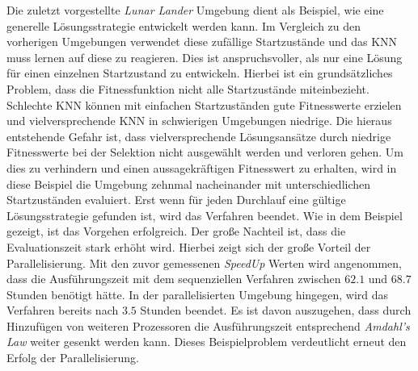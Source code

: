 Die zuletzt vorgestellte \emph{Lunar Lander} Umgebung dient als Beispiel, wie eine generelle Lösungsstrategie entwickelt werden kann. Im Vergleich zu den vorherigen Umgebungen verwendet diese zufällige Startzustände und das \ac{KNN} muss lernen auf diese zu reagieren. Dies ist anspruchsvoller, als nur eine Lösung für einen einzelnen Startzustand zu entwickeln. Hierbei ist ein grundsätzliches Problem, dass die Fitnessfunktion nicht alle Startzustände miteinbezieht. Schlechte \ac{KNN} können mit einfachen Startzuständen gute Fitnesswerte erzielen und vielversprechende \ac{KNN} in schwierigen Umgebungen niedrige. Die hieraus entstehende Gefahr ist, dass vielversprechende Lösungsansätze durch niedrige Fitnesswerte bei der Selektion nicht ausgewählt werden und verloren gehen. Um dies zu verhindern und einen aussagekräftigen Fitnesswert zu erhalten, wird in diese Beispiel die Umgebung zehnmal nacheinander mit unterschiedlichen Startzuständen evaluiert. Erst wenn für jeden Durchlauf eine gültige Lösungsstrategie gefunden ist, wird das Verfahren beendet. Wie in dem Beispiel gezeigt, ist das Vorgehen erfolgreich. Der große Nachteil ist, dass die Evaluationszeit stark erhöht wird. Hierbei zeigt sich der große Vorteil der Parallelisierung. Mit den zuvor gemessenen \emph{SpeedUp} Werten wird angenommen, dass die Ausführungszeit mit dem sequenziellen Verfahren zwischen $62.1$ und $68.7$ Stunden benötigt hätte. In der parallelisierten Umgebung hingegen, wird das Verfahren bereits nach $3.5$ Stunden beendet. Es ist davon auszugehen, dass durch Hinzufügen von weiteren Prozessoren die Ausführungszeit entsprechend \emph{Amdahl's Law} weiter gesenkt werden kann. Dieses Beispielproblem verdeutlicht erneut den Erfolg der Parallelisierung.
